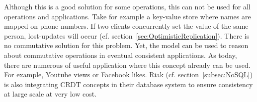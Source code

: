 \documentclass[a4paper,12pt]{report}
\begin{document}
Although this is a good solution for some operations, this can not be used for all operations and applications. Take for example a key-value store where names are mapped on phone numbers. If two clients concurrently set the value of the same person, lost-updates will occur (cf. section~\ref{sec:OptimisticReplication}). There is no commutative solution for this problem. Yet, the model can be used to reason about commutative operations in eventual consistent applications. As today, there are numerous of useful application where this concept already can be used. For example, Youtube views or Facebook likes. Riak (cf. section~\ref{subsec:NoSQL}) is also integrating CRDT concepts in their database system to ensure consistency at large scale at very low cost. 

\begin{comment}
\section{Model}\label{sec:Model}

After extracting some useful information from different eventual consistency models, it is time to find a programming model that could be suited to implement offline available collaborative web applications. This model must meet certain requirements, which are summarized below.

\begin{description}
    \item[Full-fledged Programming Model] \hfill \\The model should be a full-fledged programming model, in the sense that the developer can create his own distributed data and operations, resulting in a specific application. This generality can also be found in the CRDT model (cf. section~\ref{subsec:CRDT}). Distribution and synchronization of distributed data must be transparent for the developer.
    \item[Transparent Disconnected Operations] \hfill \\A second criteria is the transparency of disconnected operations. The developer should not be engaged with checking whether the client is online or offline while executing a specific operation. The model should keep a kind of log where executed operations are stored and automatically synchronized once the client regains connection. 
    \item[Commutativity] \hfill \\As mentioned previously, commutative operations leads to the disappearance of conflicts and the superfluity of operation scheduling while ensuring consistency at large scale. A model supporting this kind of operation would be a nice bonus.  
    \item[Strong consistency on demand] \hfill \\Sometimes strong consistency is essential in a distributed application. For example in a ticket reservation application, a user do not want to hear after the reservation that his reservation is eventually canceled. Thus, strong consistency on demand would increase the diversity of applications that could be realised with the model.
\end{description}


\end{comment}
\end{document}
